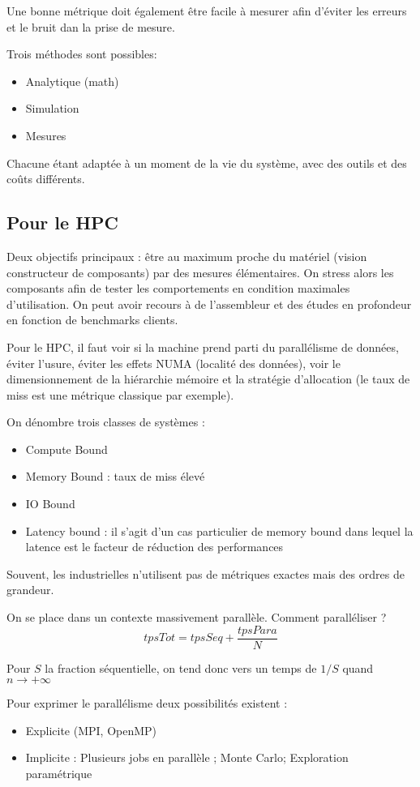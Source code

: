 \documentclass{article}
\begin{document}
Une bonne métrique doit également être facile à mesurer afin d'éviter les erreurs et le bruit dan la prise de mesure.

Trois méthodes sont possibles:
\begin{itemize}
\item Analytique (math)
\item Simulation
\item Mesures
\end{itemize}
Chacune étant adaptée à un moment de la vie du système, avec des outils et des coûts différents.

\subsection{Pour le HPC}
Deux objectifs principaux : être au maximum proche du matériel (vision constructeur de composants) par des mesures élémentaires. On stress alors les composants afin de tester les comportements en condition maximales d'utilisation. On peut avoir recours à de l'assembleur et des études en profondeur en fonction de benchmarks clients.

Pour le HPC, il faut voir si la machine prend parti du parallélisme de données, éviter l'usure, éviter les effets NUMA (localité des données), voir le dimensionnement de la hiérarchie mémoire et la stratégie d'allocation (le taux de miss est une métrique classique par exemple).
\bigskip

On dénombre trois classes de systèmes :
\begin{itemize}
\item Compute Bound
\item Memory Bound : taux de miss élevé
\item IO Bound 
\item Latency bound : il s'agit d'un cas particulier de memory bound dans lequel la latence est le facteur de réduction des performances
\end{itemize}
Souvent, les industrielles n'utilisent pas de métriques exactes mais des ordres de grandeur.
\bigskip

On se place dans un contexte massivement parallèle. Comment paralléliser ?
\[tpsTot = tpsSeq + \dfrac{tpsPara}{N}\]

Pour $S$ la fraction séquentielle, on tend donc vers un temps de $1/S$ quand $n\to +\infty$
\bigskip

Pour exprimer le parallélisme deux possibilités existent :
\begin{itemize}
\item Explicite (MPI, OpenMP)
\item Implicite : Plusieurs jobs en parallèle ; Monte Carlo; Exploration paramétrique
\end{itemize}
\end{document}
